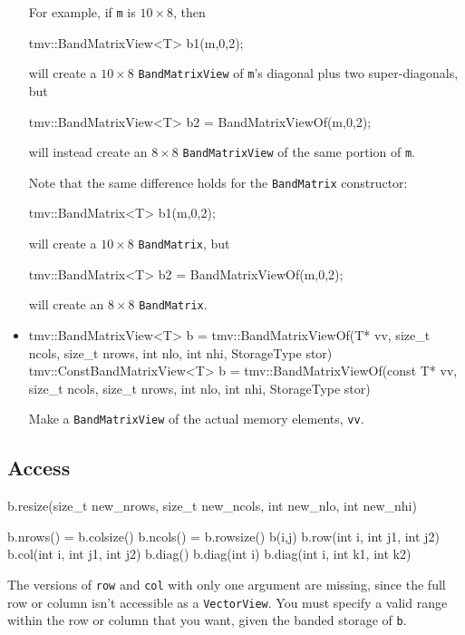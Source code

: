 \documentclass[twoside,letterpaper,11pt]{article}
\renewcommand{\tt}[1]{{\lstinline {#1}}}
\begin{document}
\begin{itemize}
For example, if \tt{m} is $10 \times 8$, then 
\begin{tmvcode}
tmv::BandMatrixView<T> b1(m,0,2);
\end{tmvcode}
will create a $10 \times 8$ \tt{BandMatrixView} of \tt{m}'s diagonal plus two super-diagonals, but
\begin{tmvcode}
tmv::BandMatrixView<T> b2 = BandMatrixViewOf(m,0,2);
\end{tmvcode}
will instead create an $8 \times 8$ \tt{BandMatrixView} of the same portion of \tt{m}.

Note that the same difference holds for the \tt{BandMatrix} constructor:
\begin{tmvcode}
tmv::BandMatrix<T> b1(m,0,2);
\end{tmvcode}
will create a $10 \times 8$ \tt{BandMatrix}, but
\begin{tmvcode}
tmv::BandMatrix<T> b2 = BandMatrixViewOf(m,0,2);
\end{tmvcode}
will create an $8 \times 8$ \tt{BandMatrix}.

\item
\begin{tmvcode}
tmv::BandMatrixView<T> b = 
      tmv::BandMatrixViewOf(T* vv, size_t ncols, size_t nrows, 
          int nlo, int nhi, StorageType stor)
tmv::ConstBandMatrixView<T> b = 
      tmv::BandMatrixViewOf(const T* vv, size_t ncols, size_t nrows, 
          int nlo, int nhi, StorageType stor)
\end{tmvcode}
Make a \tt{BandMatrixView} of the actual memory elements, \tt{vv}.

\end{itemize}

\subsection{Access}
\label{BandMatrix_Access}

\begin{tmvcode}
b.resize(size_t new_nrows, size_t new_ncols, int new_nlo, int new_nhi)
\end{tmvcode}

\begin{tmvcode}
b.nrows() = b.colsize()
b.ncols() = b.rowsize()
b(i,j)
b.row(int i, int j1, int j2)
b.col(int i, int j1, int j2)
b.diag()
b.diag(int i)
b.diag(int i, int k1, int k2)
\end{tmvcode}
The versions of \tt{row} and \tt{col} with only one argument are
missing, since the full row or column isn't accessible as a \tt{VectorView}.
You must specify a valid range within the row or column that you want, 
given the banded storage of \tt{b}.
\end{document}
